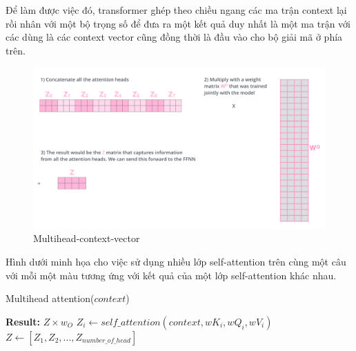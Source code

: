 Để làm được việc đó, transformer ghép theo chiều ngang các ma trận context lại rồi nhân với một bộ trọng số để đưa ra một kết quả duy nhất là một ma trận với các dùng là các context vector cũng đồng thời là đầu vào cho bộ giải mã ở phía trên.

\begin{figure}[H]
    \begin{center}
        \includegraphics[scale=0.3]{images/transformer_attention_heads_weight_matrix_o}
        \caption{Multihead-context-vector}
        \label{fig:multihead-feed-forward}
    \end{center}
\end{figure}

Hình dưới minh họa cho việc sử dụng nhiều lớp self-attention trên cùng một câu với mỗi một màu tương ứng với kết quả của một lớp self-attention khác nhau.

\begin{algorithm}[H]
    \caption{Multihead attention($context$)}
    \begin{algorithmic}[1]
		\State \textbf{Result:} $Z \times w_O$
			\State $Z_i \gets self\_attention(context, wK_i, wQ_i, wV_i)$
		\EndFor
		\State $Z \gets [Z_1, Z_2,... ,Z_{number\_of\_head}]$
    \end{algorithmic}
\end{algorithm}


